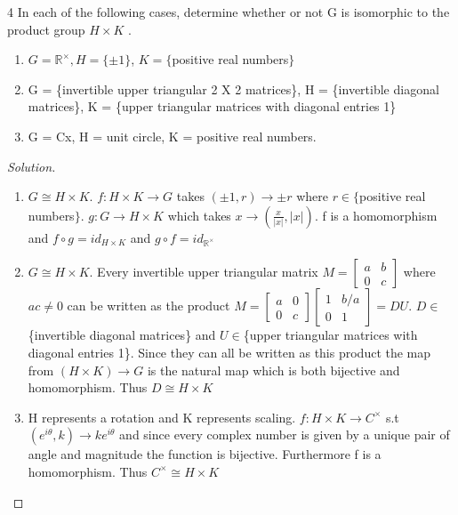 \documentclass{article}
\newcommand{\R}{\mathbb{R}}
\newcommand{\abs}[1]{\lvert #1\rvert}
\newenvironment{solution}
{\renewcommand\qedsymbol{$\blacksquare$}\begin{proof}[Solution]}
{\end{proof}}
\begin{document}
\begin{PROB}{4}\label{Problem 4.}
    In each of the following cases, determine whether or not G is isomorphic to the product group $H \times K$ .

    \begin{enumerate}{}
        \item $G = \R^\times, H = \{\pm 1\}$, $K = \{$positive real numbers$\}$
        \item G = \{invertible upper triangular 2 X 2 matrices\}, H = \{invertible diagonal matrices\},
        K = \{upper triangular matrices with diagonal entries 1\}
        \item G = Cx, H = {unit circle}, K = {positive real numbers}.
    \end{enumerate}
\end{PROB}
\begin{solution}
    \begin{enumerate}
        \item $G \cong H \times K$. $f: H\times K \to G$ takes $(\pm 1, r) \to \pm r$ where $r \in \{$positive real numbers$\}$. $g: G \to H\times K$ which takes $x \to (\frac{x}{\abs{x}}, \abs{x})$. f is a homomorphism and $f \circ g = id_{H \times K}$ and $g \circ f = id_{\R^\times}$
        \item $G \cong H \times K$. Every invertible upper triangular matrix $M = \begin{bmatrix}
            a & b \\ 0 & c
        \end{bmatrix}$ where $ac \neq 0$ can be written as the product $M = \begin{bmatrix}
            a & 0 \\ 0 & c
        \end{bmatrix}\begin{bmatrix}
            1 & b/a \\ 0 & 1
        \end{bmatrix} = DU$. $D \in$\{invertible diagonal matrices\} and $U \in$\{upper triangular matrices with diagonal entries 1\}. Since they can all be written as this product the map from $(H \times K) \to G$ is the natural map which is both bijective and homomorphism. Thus $D \cong H \times K$ 
        \item H represents a rotation and K represents scaling. $f: H \times K \to C^\times$ s.t $(e^{i\theta}, k) \to ke^{i\theta}$ and since every complex number is given by a unique pair of angle and magnitude the function is bijective. Furthermore f is a homomorphism. Thus $C^\times \cong H \times K$
    \end{enumerate}
\end{solution}
\end{document}
